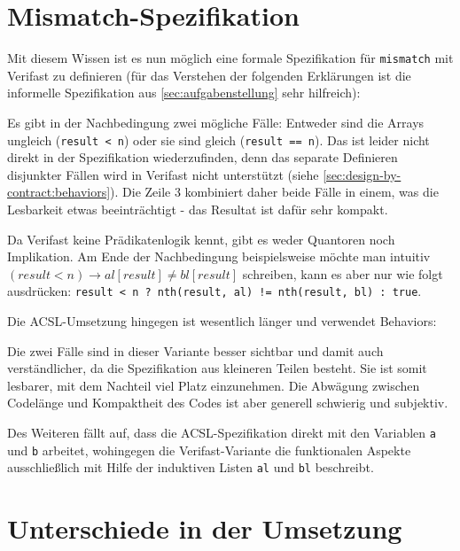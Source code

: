 \section{Mismatch-Spezifikation}

Mit diesem Wissen ist es nun möglich eine formale Spezifikation für \lstinline{mismatch} mit Verifast
zu definieren (für das Verstehen der folgenden Erklärungen ist die informelle Spezifikation aus 
\ref{sec:aufgabenstellung} sehr hilfreich):



Es gibt in der Nachbedingung zwei mögliche Fälle: Entweder sind die Arrays ungleich
(\lstinline{result < n}) oder sie sind gleich (\lstinline{result == n}). Das ist leider nicht direkt
in der Spezifikation wiederzufinden, denn das separate Definieren disjunkter Fällen wird in Verifast 
nicht unterstützt (siehe \ref{sec:design-by-contract:behaviors}). Die Zeile 3 kombiniert daher beide Fälle 
in einem, was die Lesbarkeit etwas beeinträchtigt - das Resultat ist dafür sehr kompakt.

Da Verifast keine Prädikatenlogik kennt, gibt es weder Quantoren noch Implikation. Am Ende der
Nachbedingung beispielsweise möchte man intuitiv \((result < n) \rightarrow al[result] \neq  bl[result]\)
schreiben, kann es aber nur wie folgt ausdrücken: 
\lstinline{result < n ? nth(result, al) != nth(result, bl) : true}.

Die ACSL-Umsetzung hingegen ist wesentlich länger und verwendet Behaviors:



Die zwei Fälle sind in dieser Variante besser sichtbar und damit auch verständlicher, da die Spezifikation
aus kleineren Teilen besteht. Sie ist somit lesbarer, mit dem Nachteil viel Platz einzunehmen.
Die Abwägung zwischen Codelänge und Kompaktheit des Codes ist aber generell schwierig und subjektiv.

Des Weiteren fällt auf, dass die ACSL-Spezifikation direkt mit den Variablen \lstinline{a} und
\lstinline{b} arbeitet, wohingegen die Verifast-Variante die funktionalen Aspekte ausschließlich
mit Hilfe der induktiven Listen \lstinline{al} und \lstinline{bl} beschreibt. 



\section{Unterschiede in der Umsetzung}

